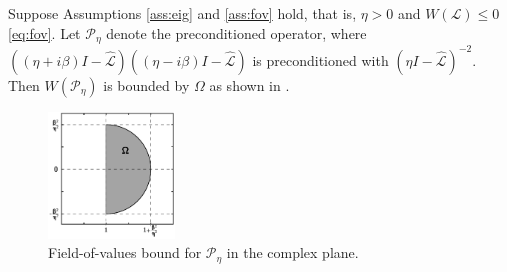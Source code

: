 \documentclass[review]{siamart}
\begin{document}
%
\begin{theorem}\label{th:fov}
Suppose Assumptions \ref{ass:eig} and \ref{ass:fov} hold, that is, $\eta > 0$
and $W(\mathcal{L}) \leq 0$ \eqref{eq:fov}. Let $\mathcal{P}_\eta$ denote the
preconditioned operator, where $((\eta + i\beta)I -
\widehat{\mathcal{L}})((\eta - i\beta)I - \widehat{\mathcal{L}})$ is
preconditioned with $(\eta I - \widehat{\mathcal{L}})^{-2}$. Then
$W(\mathcal{P}_\eta)$ is bounded by $\Omega$ as shown in .
\begin{figure}[h!]
\centering
\includegraphics[width = 0.3\textwidth]{./figures/fov.pdf}
\caption{Field-of-values bound for $\mathcal{P}_\eta$ in the complex plane.}
\label{fig:bound}
\end{figure}
\end{theorem}
\end{document}
